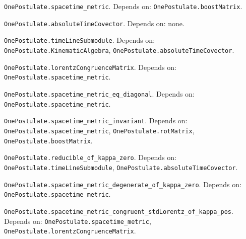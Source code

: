 \begin{definition}\label{OnePostulate.spacetime_metric}
\texttt{OnePostulate.spacetime\_metric}. Depends on: \texttt{OnePostulate.boostMatrix}.
\end{definition}

\begin{definition}\label{OnePostulate.absoluteTimeCovector}
\texttt{OnePostulate.absoluteTimeCovector}. Depends on: none.
\end{definition}

\begin{definition}\label{OnePostulate.timeLineSubmodule}
\texttt{OnePostulate.timeLineSubmodule}. Depends on: \texttt{OnePostulate.KinematicAlgebra}, \texttt{OnePostulate.absoluteTimeCovector}.
\end{definition}

\begin{definition}\label{OnePostulate.lorentzCongruenceMatrix}
\texttt{OnePostulate.lorentzCongruenceMatrix}. Depends on: \texttt{OnePostulate.spacetime\_metric}.
\end{definition}

\begin{lemma}\label{OnePostulate.spacetime_metric_eq_diagonal}
\texttt{OnePostulate.spacetime\_metric\_eq\_diagonal}. Depends on: \texttt{OnePostulate.spacetime\_metric}.
\end{lemma}

\begin{lemma}\label{OnePostulate.spacetime_metric_invariant}
\texttt{OnePostulate.spacetime\_metric\_invariant}. Depends on: \texttt{OnePostulate.spacetime\_metric}, \texttt{OnePostulate.rotMatrix}, \texttt{OnePostulate.boostMatrix}.
\end{lemma}

\begin{lemma}\label{OnePostulate.reducible_of_kappa_zero}
\texttt{OnePostulate.reducible\_of\_kappa\_zero}. Depends on: \texttt{OnePostulate.timeLineSubmodule}, \texttt{OnePostulate.absoluteTimeCovector}.
\end{lemma}

\begin{lemma}\label{OnePostulate.spacetime_metric_degenerate_of_kappa_zero}
\texttt{OnePostulate.spacetime\_metric\_degenerate\_of\_kappa\_zero}. Depends on: \texttt{OnePostulate.spacetime\_metric}.
\end{lemma}

\begin{lemma}\label{OnePostulate.spacetime_metric_congruent_stdLorentz_of_kappa_pos}
\texttt{OnePostulate.spacetime\_metric\_congruent\_stdLorentz\_of\_kappa\_pos}. Depends on: \texttt{OnePostulate.spacetime\_metric}, \texttt{OnePostulate.lorentzCongruenceMatrix}.
\end{lemma}

